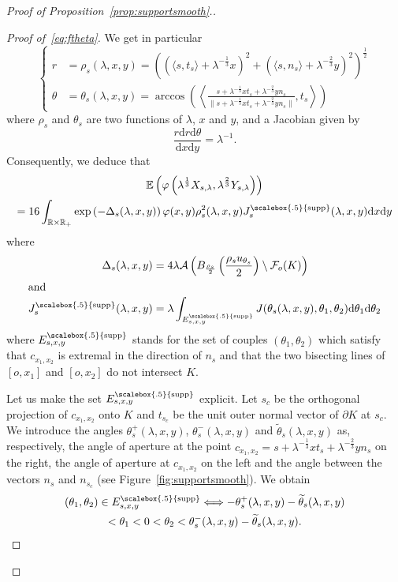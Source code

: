 \documentclass[10pt]{amsart}
\theoremstyle{definition}\newtheorem{defi}[theo]{Definition}\newtheorem{rema}[theo]{Remark}\newtheorem{exam}[theo]{Example}\newtheorem{exem}[theo]{Example}\newtheorem{nota}[theo]{Notation}
\newcommand{\cA}{\mathcal{A}}
\newcommand{\cF}{\mathcal{F}}
\newcommand{\dd}{\mathrm{d}}
\newcommand{\E}{\mathbb{E}}
\newcommand{\R}{\mathbb{R}}
\DeclareMathOperator{\supp}{\scalebox{.5}{supp}}
\newcommand{\pass}{\vspace{0.3cm}\noindent}
\newcommand{\noi}{\noindent}
\newenvironment*{prooff}{\begin{proof}}{\let\qed\relax\end{proof}}
\begin{document}
\begin{proof}[{Proof of Proposition~\ref{prop:supportsmooth}.}]
\begin{prooff}[{Proof of~\eqref{eq:ftheta}}]
We get in particular
\begin{equation}\label{eq:defrho}
\begin{cases}
r &=  \rho_s(\lambda,x,y)=\left(\left(\langle s,t_s\rangle+\lambda^{-\frac{1}{3}}x\right)^2+\left(\langle s,n_s\rangle+\lambda^{-\frac{2}{3}}y\right)^2\right)^\frac12 \\
\theta &=  \theta_s(\lambda,x,y) = \arccos\left(\left\langle \frac{s+\lambda^{-\frac1{3}}xt_s+\lambda^{-\frac{2}{3}}yn_s}{\bigl\|s+\lambda^{-\frac{1}{3}}xt_s+\lambda^{-\frac{2}{3}}yn_s\bigr\|},t_{s}\right\rangle\right)
\end{cases}
\end{equation}
where $\rho_s$ and $\theta_s$ are two functions of $\lambda$, $x$ and $y$, and a Jacobian given by
\[
\frac{r\dd r\dd \theta}{\dd x \dd y} = \lambda^{-1}.
\]
Consequently, we deduce that
\begin{multline}\label{eq:formuleexacte}
\E\left(\varphi\left(\lambda^{\frac1{3}}X_{s,\lambda},\lambda^{\frac{2}{3}}Y_{s,\lambda}\right)\right)\\
= 16\int_{\R\times \R_+}\exp\left(-\Delta_s(\lambda,x,y)\right)\varphi(x,y)\rho_s^2(\lambda,x,y)J^{\supp}_s(\lambda,x,y)\dd x \dd y
\end{multline}
where
\begin{align*}
\Delta_s(\lambda,x,y)&=4\lambda\cA\left(B_{\frac{\rho_s}{2}}\left(\frac{\rho_s u_{\theta_s}}{2}\right)\setminus \cF_o(K)\right)
\\
\intertext{and}
J^{\supp}_s(\lambda,x,y)&=\lambda\int_{E^{\supp}_{s,x,y}} J(\theta_s(\lambda,x,y),\theta_1,\theta_2)\dd \theta_1\dd \theta_2
\end{align*}
where $E^{\supp}_{s,x,y}$ stands for the set of couples $(\theta_1,\theta_2)$ which satisfy that $c_{x_1,x_2}$ is extremal in the direction of $n_s$ and that the two bisecting lines of $[o,x_1]$ and $[o,x_2]$ do not intersect $K$.

Let us make the set $E^{\supp}_{s,x,y}$ explicit. Let $s_c$ be the orthogonal projection of $c_{x_1,x_2}$ onto $K$ and $t_{s_c}$ be the unit outer normal vector of $\partial K$ at $s_c$. We introduce the angles $\theta_s^+(\lambda,x,y)$, $\theta_s^-(\lambda,x,y)$ and $\widetilde{\theta}_s(\lambda,x,y)$ as, respectively, the angle of aperture at the point $c_{x_1,x_2}=s+\lambda^{-\frac1{3}}x t_s+\lambda^{-\frac{2}{3}}y n_s$ on the right, the angle of aperture at $c_{x_1,x_2}$ on the left and the angle between the vectors $n_s$ and $n_{s_c}$ (see Figure~\ref{fig:supportsmooth}). We obtain
\begin{multline}\label{eq:condanglessmooth}
(\theta_1,\theta_2)\in E^{\supp}_{s,x,y}\Longleftrightarrow -\theta_s^+(\lambda,x,y)-\widetilde{\theta}_s(\lambda,x,y)\\
< \theta_1<0<\theta_2<\theta_s^-(\lambda,x,y)-\widetilde{\theta}_s(\lambda,x,y).
\end{multline}


\end{prooff}
\end{proof}
\end{document}

